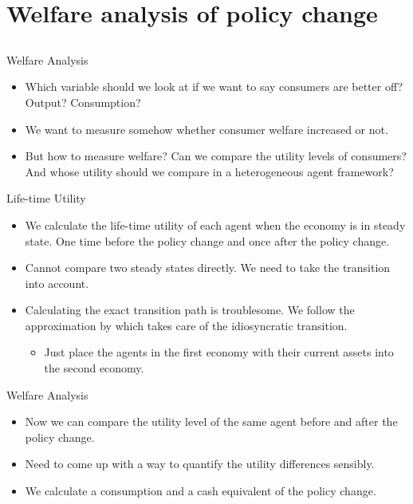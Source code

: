 \documentclass{beamer}
\begin{document}
\section{Welfare analysis of policy change}
\subsection{}
\begin{frame}{Welfare Analysis}
  \begin{itemize}
  \item {
  Which variable should we look at if we want to say consumers are better off? Output? Consumption?
  }
  \item {
  We want to measure somehow whether consumer welfare increased or not.
  }
  \item {
  But how to measure welfare? Can we compare the utility levels of consumers? And whose utility should we compare in a heterogeneous agent framework?
  }
  \end{itemize}
\end{frame}

\begin{frame}{Life-time Utility}
  \begin{itemize}
  \item {
  We calculate the life-time utility of each agent when the economy is in steady state. One time before the policy change and once after the policy change.
  }
  \item {
  Cannot compare two steady states directly. We need to take the transition into account.
  }
  \item {
  Calculating the exact transition path is troublesome. We follow the approximation by \citeauthor{sahin} \cite{sahin} which takes care of the idiosyncratic transition.
  }
    \begin{itemize}
    \item {
    Just place the agents in the first economy with their current assets into the second economy.
    }
    \end{itemize}
  \end{itemize}
\end{frame}

\begin{frame}{Welfare Analysis}
  \begin{itemize}
  \item {
  Now we can compare the utility level of the same agent before and after the policy change.
  }
  \item {
  Need to come up with a way to quantify the utility differences sensibly.
  }
  \item {
  We calculate a consumption and a cash equivalent of the policy change.
  }
  \end{itemize}
\end{frame}
\end{document}
